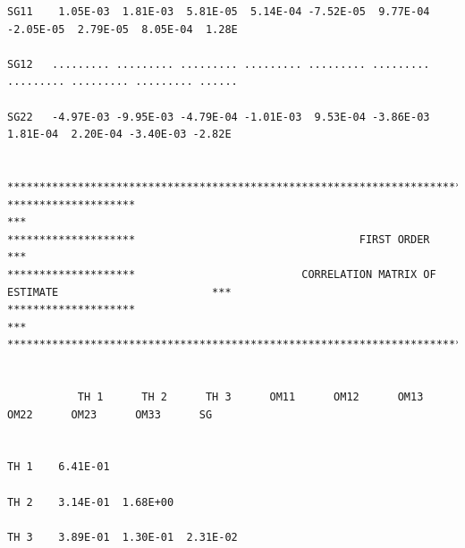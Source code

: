 \documentclass[
  10pt,
]{krantz}
\begin{document}
\begin{verbatim}
SG11    1.05E-03  1.81E-03  5.81E-05  5.14E-04 -7.52E-05  9.77E-04 -2.05E-05  2.79E-05  8.05E-04  1.28E
                                                                                                       
SG12   ......... ......... ......... ......... ......... ......... ......... ......... ......... ......
                                                                                                       
SG22   -4.97E-03 -9.95E-03 -4.79E-04 -1.01E-03  9.53E-04 -3.86E-03  1.81E-04  2.20E-04 -3.40E-03 -2.82E
                                                                                                       
                                                                                                       
*******************************************************************************************************
********************                                                                                ***
********************                                   FIRST ORDER                                  ***
********************                          CORRELATION MATRIX OF ESTIMATE                        ***
********************                                                                                ***
*******************************************************************************************************
                                                                                                       
                                                                                                       
           TH 1      TH 2      TH 3      OM11      OM12      OM13      OM22      OM23      OM33      SG
                                                                                                       
                                                                                                       
TH 1    6.41E-01                                                                                       
                                                                                                       
TH 2    3.14E-01  1.68E+00                                                                             
                                                                                                       
TH 3    3.89E-01  1.30E-01  2.31E-02                                                                   
                                                                                                       

\end{verbatim}
\end{document}
